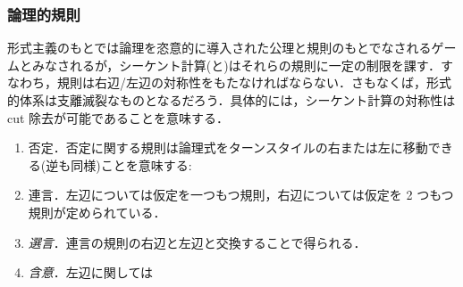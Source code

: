 \documentclass[a4paper,10pt,platex, dvipdfmx]{jsarticle}
\begin{document}
\subsubsection{論理的規則}
形式主義のもとでは論理を恣意的に導入された公理と規則のもとでなされるゲームとみなされるが，シーケント計算(と)はそれらの規則に一定の制限を課す．すなわち，規則は右辺/左辺の対称性をもたなければならない．さもなくば，形式的体系は支離滅裂なものとなるだろう．具体的には，シーケント計算の対称性は cut 除去が可能であることを意味する．
\begin{enumerate}
\item 否定．否定に関する規則は論理式をターンスタイルの右または左に移動できる(逆も同様)ことを意味する:\begin{prooftree}
\end{prooftree}
\begin{prooftree}
\end{prooftree}
\item 連言．左辺については仮定を一つもつ規則，右辺については仮定を 2 つもつ規則が定められている．
\begin{prooftree}
\end{prooftree}
\begin{prooftree}
\end{prooftree}
\begin{prooftree}
\end{prooftree}
  \item \emph{選言}．連言の規則の右辺と左辺と交換することで得られる．
\begin{prooftree}
\end{prooftree}
\begin{prooftree}
\end{prooftree}
\begin{prooftree}
\end{prooftree}
\item \emph{含意}．左辺に関しては
\end{enumerate}
\end{document}
